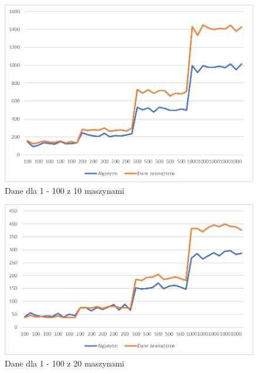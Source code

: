 \begin{figure}[h]
    \centering
    \includegraphics[scale=0.3]{1-100_10.png}
    \caption{Dane dla 1 - 100 z 10 maszynami}
    \label{1-100_10}
\end{figure}



\begin{figure}[h]
    \centering
    \includegraphics[scale=0.3]{1-100_20.png}
    \caption{Dane dla 1 - 100 z 20 maszynami}
    \label{1-100_20}
\end{figure}


